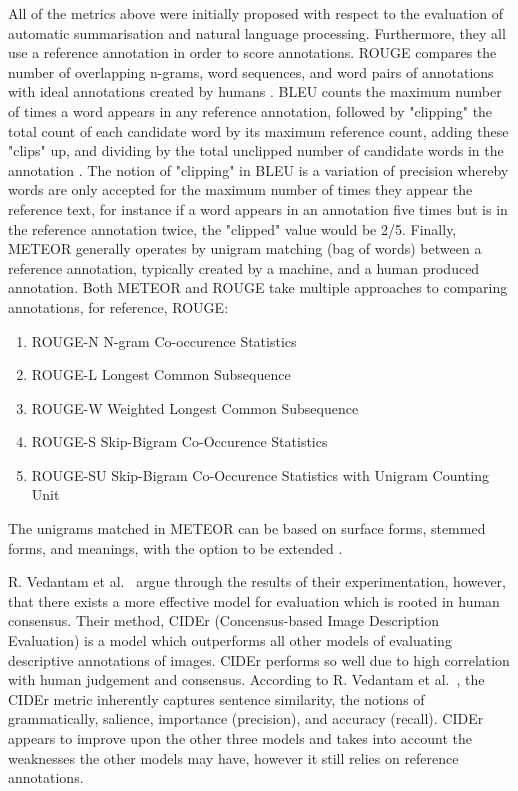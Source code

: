 All of the metrics above were initially proposed with respect to the evaluation of automatic summarisation and natural language processing. Furthermore, they all use a reference annotation in order to score annotations. ROUGE compares the number of overlapping n-grams, word sequences, and word pairs of annotations with ideal annotations created by humans \citep{lin2004rouge}. BLEU counts the maximum number of times a word appears in any reference annotation, followed by "clipping" the total count of each candidate word by its maximum reference count, adding these "clips" up, and dividing by the total unclipped number of candidate words in the annotation \citep{papineni2002bleu}. The notion of "clipping" in BLEU is a variation of precision whereby words are only accepted for the maximum number of times they appear the reference text, for instance if a word appears in an annotation five times but is in the reference annotation twice, the "clipped" value would be 2/5. Finally, METEOR generally operates by unigram matching (bag of words) between a reference annotation, typically created by a machine, and a human produced annotation. Both METEOR and ROUGE take multiple approaches to comparing annotations, for reference, ROUGE:
\begin{enumerate}
    \item ROUGE-N N-gram Co-occurence Statistics
    \item ROUGE-L Longest Common Subsequence
    \item ROUGE-W Weighted Longest Common Subsequence
    \item ROUGE-S Skip-Bigram Co-Occurence Statistics
    \item ROUGE-SU Skip-Bigram Co-Occurence Statistics with Unigram Counting Unit
\end{enumerate}
The unigrams matched in METEOR can be based on surface forms, stemmed forms, and meanings, with the option to be extended \citep{elliott2013image}.

R. Vedantam et al.~\citep{vedantam2015cider} argue through the results of their experimentation, however, that there exists a more effective model for evaluation which is rooted in human consensus. Their method, CIDEr (Concensus-based Image Description Evaluation) is a model which outperforms all other models of evaluating descriptive annotations of images. CIDEr performs so well due to high correlation with human judgement and consensus. According to R. Vedantam et al.~\cite{vedantam2015cider}, the CIDEr metric inherently captures sentence similarity, the notions of grammatically, salience, importance (precision), and accuracy (recall). CIDEr appears to improve upon the other three models and takes into account the weaknesses the other models may have, however it still relies on reference annotations.

